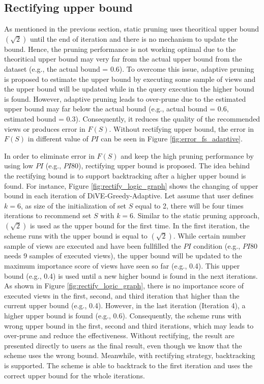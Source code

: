 \documentclass{article}
\begin{document}
\subsection{Rectifying upper bound}
As mentioned in the previous section, static pruning uses theoritical upper bound $(\sqrt{2})$ until the end of iteration and there is no mechanism to update the bound. Hence, the pruning performance is not working optimal due to the theoritical upper bound may very far from the actual upper bound from the dataset (e.g., the actual bound = 0.6). To overcome this issue, adaptive pruning is proposed to estimate the upper bound by executing some sample of views and the upper bound will be updated while in the query execution the higher bound is found. However, adaptive pruning leads to over-prune due to the estimated upper bound may far below the actual bound (e.g., actual bound = 0.6, estimated bound = 0.3). Consequently, it reduces the quality of the recommended views or produces error in $F(S)$. Without rectifying upper bound, the error in $F(S)$ in different value of $PI$ can be seen in Figure \ref{fig:error_fs_adaptive}.

In order to eliminate error in $F(S)$ and keep the high pruning performance by using low $PI$ (e.g., $PI80$), rectifying upper bound is proposed. The idea behind the rectifying bound is to support backtracking after a higher upper bound is found. For instance, Figure \ref{fig:rectify_logic_graph} shows the changing of upper bound in each iteration of DiVE-Greedy-Adaptive. Let assume that user defines $k = 6$, as size of the initialization of set $S$ equal to 2, there will be four times iterations to recommend set $S$ with $k = 6$. Similar to the static pruning approach, $(\sqrt{2})$ is used as the upper bound for the first time. In the first iteration, the scheme runs with the upper bound is equal to $(\sqrt{2})$. While certain number sample of views are executed and have been fullfilled the $PI$ condition (e.g., $ PI80 $ needs 9 samples of executed views), the upper bound will be updated to the maximum importance score of views have seen so far (e.g., 0.4). This upper bound (e.g., 0.4) is used until a new higher bound is found in the next iterations. As shown in Figure \ref{fig:rectify_logic_graph}, there is no importance score of executed views in the first, second, and third iteration that higher than the current upper bound (e.g., 0.4). However, in the last iteration (Iteration 4), a higher upper bound is found (e.g., 0.6). Consequently, the scheme runs with wrong upper bound in the first, second and third iterations, which may leads to over-prune and reduce the effectiveness. Without rectifying, the result are presented directly to users as the final result, even though we know that the scheme uses the wrong bound. Meanwhile, with rectifying strategy, backtracking is supported. The scheme is able to backtrack to the first iteration and uses the correct upper bound for the whole iterations. 
\end{document}

